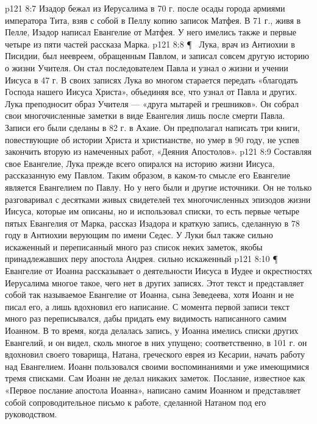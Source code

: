 \vs p121 8:7 Изадор бежал из Иерусалима в 70 г. после осады города армиями императора Тита, взяв с собой в Пеллу копию записок Матфея. В 71 г., живя в Пелле, Изадор написал Евангелие от Матфея. У него имелись также и первые четыре из пяти частей рассказа Марка.
\vs p121 8:8 \P\ \bibnobreakspace {} Лука, врач из Антиохии в Писидии, был неевреем, обращенным Павлом, и записал совсем другую историю о жизни Учителя. Он стал последователем Павла и узнал о жизни и учении Иисуса в 47 г. В своих записях Лука во многом старается передать «благодать Господа нашего Иисуса Христа», объединяя все, что узнал от Павла и других. Лука преподносит образ Учителя --- «друга мытарей и грешников». Он собрал свои многочисленные заметки в виде Евангелия лишь после смерти Павла. Записи его были сделаны в 82 г. в Ахаие. Он предполагал написать три книги, повествующие об истории Христа и христианстве, но умер в 90 году, не успев закончить вторую из намеченных работ, «Деяния Апостолов».
\vs p121 8:9 Составляя свое Евангелие, Лука прежде всего опирался на историю жизни Иисуса, рассказанную ему Павлом. Таким образом, в каком\hyp{}то смысле его Евангелие является Евангелием по Павлу. Но у него были и другие источники. Он не только разговаривал с десятками живых свидетелей тех многочисленных эпизодов жизни Иисуса, которые им описаны, но и использовал списки, то есть первые четыре пятых Евангелия от Марка, рассказ Изадора и краткую запись, сделанную в 78 году в Антиохии верующим по имени Седес. У Луки был также сильно искаженный и переписанный много раз список неких заметок, якобы принадлежавших перу апостола Андрея. сильно искаженный
\vs p121 8:10 \P\ \bibnobreakspace {} Евангелие от Иоанна рассказывает о деятельности Иисуса в Иудее и окрестностях Иерусалима многое такое, чего нет в других записях. Этот текст и представляет собой так называемое Евангелие от Иоанна, сына Зеведеева, хотя Иоанн и не писал его, а лишь вдохновил его написание. С момента первой записи текст много раз переписывался, дабы придать ему видимость написанного самим Иоанном. В то время, когда делалась запись, у Иоанна имелись списки других Евангелий, и он видел, сколь многое в них упущено; соответственно, в 101 г. он вдохновил своего товарища, Натана, греческого еврея из Кесарии, начать работу над Евангелием. Иоанн пользовался своими воспоминаниями и уже имеющимися тремя списками. Сам Иоанн не делал никаких заметок. Послание, известное как «Первое послание апостола Иоанна», написано самим Иоанном и представляет собой сопроводительное письмо к работе, сделанной Натаном под его руководством.
